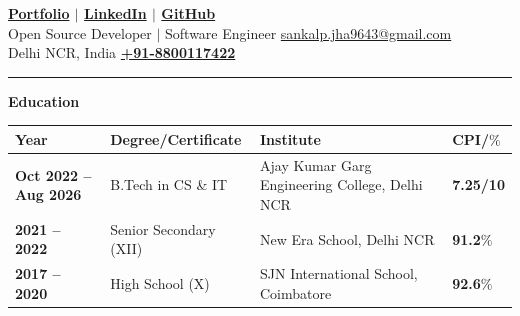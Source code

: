 \documentclass[9pt]{extarticle}
\newcommand{\sectionhead}[1]{%
  \par\vspace{7.5pt}%
  \noindent\begin{tcolorbox}\textbf{\fontsize{10}{10.5}\selectfont #1}\end{tcolorbox}%
}
\begin{document}
\vspace*{-\topskip}
\fontsize{9}{10.8}\selectfont
\pagestyle{empty}
\raggedbottom
\setlength{\parskip}{0pt}
\setlength{\parsep}{0pt}
\setlength{\topsep}{0pt}
\setlength{\partopsep}{0pt}
\setlength{\multicolsep}{4pt}

 \hfill
\textbf{\href{https://sankalpjha.dev}{Portfolio} $|$
\href{https://www.linkedin.com/in/sankalp-jha-18a95a244/}{LinkedIn} $|$
\href{https://github.com/blackdragoon26}{GitHub}}\\[1pt]
Open Source Developer $|$ Software Engineer \hfill \href{mailto:sankalp.jha9643@gmail.com}{sankalp.jha9643@gmail.com}\\[1pt]
Delhi NCR, India \hfill \href{tel:+918800117422}{\textbf{+91-8800117422}}

\noindent\rule[0.5ex]{\linewidth}{0.4pt}%
\sectionhead{Education}%
\noindent\begin{tabular}{|p{3.2cm}|p{5.8cm}|p{8.5cm}|p{1.5cm}|}
\hline
\centering\textbf{Year} & \centering\textbf{Degree/Certificate} & \centering\textbf{Institute} & \textbf{CPI/$\%$}\\
\hline
\centering\fontsize{8.5}{9.5}\selectfont\textbf{Oct 2022 -- Aug 2026} & \centering B.Tech in CS \& IT & \centering Ajay Kumar Garg Engineering College, Delhi NCR & \textbf{7.25/10}\\
\hline
\centering\fontsize{8.5}{9.5}\selectfont\textbf{2021 -- 2022} & \centering Senior Secondary (XII) & \centering New Era School, Delhi NCR & \textbf{91.2$\%$}\\
\hline
\centering\fontsize{8.5}{9.5}\selectfont\textbf{2017 -- 2020} & \centering High School (X) & \centering SJN International School, Coimbatore & \textbf{92.6$\%$}\\
\hline
\end{tabular}%
\end{document}
